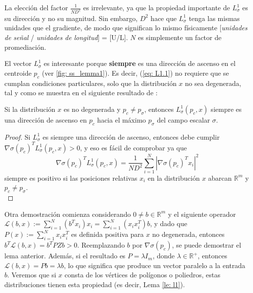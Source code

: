 \newpage

\begin{rem}
La elección del factor $\frac{1}{ND^2}$ es irrelevante, ya que la propiedad importante de $L^1_\sigma$ es su dirección y no su magnitud. Sin embargo, $D^2$ hace que $L^1_\sigma$ tenga las mismas unidades que el gradiente, de modo que significan lo mismo físicamente [\emph{unidades de señal} / \emph{unidades de longitud}] = [U/L]. $N$ es simplemente un factor de promediación.
\end{rem}

El vector $L^1_\sigma$ es interesante porque \textbf{siempre} es una dirección de ascenso en el centroide $p_c$ (ver \autoref{fig: ss_lemma1}). Es decir, (\ref{eq: L1.1}) no requiere que se cumplan condiciones particulares, solo que la distribución $x$ no sea degenerada, tal y como se muestra en el siguiente resultado de \cite{tfg_antonio}:

\vspace{0.5cm}

\begin{lemma} 
\label{le: l1}
Si la distribución $x$ es no degenerada y $p_c \neq p_\sigma$, entonces $L^1_\sigma(p_c,x)$ siempre es una dirección de ascenso en $p_c$ hacia el máximo $p_\sigma$ del campo escalar $\sigma$.
\end{lemma}
\begin{proof}
Si $L^1_\sigma$ es  siempre una dirección de ascenso, entonces debe cumplir $\nabla\sigma(p_c)^TL^1_\sigma(p_c, x) > 0$, y eso es fácil de comprobar ya que
\begin{equation}
\nabla\sigma(p_c)^TL^1_\sigma(p_c, x) = \frac{1}{ND^2}\sum_{i=1}^N |\nabla\sigma(p_c)^Tx_i|^2 \nonumber
\end{equation}
siempre es positivo si las posiciones relativas $x_i$ en la distribución $x$ abarcan $\mathbb{R}^m$ y $p_c \neq p_\sigma$.\\
\end{proof}

\vspace{0.2cm}

\begin{rem} \label{rem: L1}
Otra demostración comienza considerando $0 \neq b\in\mathbb{R}^m$ y el siguiente operador $\mathcal{L}(b, x) := \sum_{i=1}^N (b^Tx_i)x_i = \sum_{i=1}^N (x_ix_i^T)b$, y dado que $P(x) := \sum_{i=1}^N x_ix_i^T$ es definida positiva para $x$ no degenerada, entonces $b^T \mathcal{L}(b, x) = b^T P
Z b > 0$. Reemplazando $b$ por $\nabla \sigma(p_c)$, se puede demostrar el lema anterior. Además, si el resultado es $P = \lambda I_m$, donde $\lambda \in\mathbb{R}^+$, entonces $\mathcal{L}(b, x) = P b = \lambda b$, lo que significa que produce un vector paralelo a la entrada $b$. Veremos que si $x$ consta de los vértices de polígonos o poliedros, estas distribuciones tienen esta propiedad (es decir, Lema \ref{le: l1}).
\end{rem}

